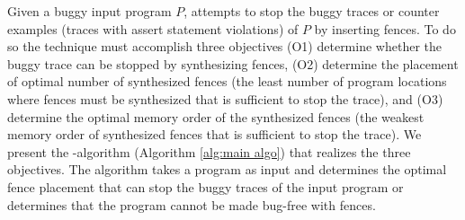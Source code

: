 Given a buggy input program $P$, \ourtechnique attempts to 
stop the buggy traces or counter examples (traces with 
assert statement violations) of $P$ by inserting \cc fences.
%
To do so the technique must accomplish three objectives
(O1) determine whether the buggy trace can be stopped by 
synthesizing \cc fences,
(O2) determine the placement of optimal number of synthesized 
fences (\ie the least number of program locations where fences 
must be synthesized that is sufficient to stop the trace), 
and
(O3) determine the optimal memory order of the synthesized 
fences (\ie the weakest memory order of synthesized fences 
that is sufficient to stop the trace).
%
We present the \ourtechnique-algorithm (Algorithm
\ref{alg:main algo}) that realizes the three objectives.
The algorithm takes a \cc program as input
and determines the optimal fence placement that can stop
the buggy traces of the input program or determines that
the program cannot be made bug-free with \cc fences.

